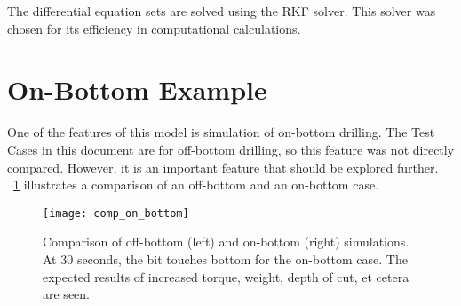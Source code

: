 \begin{mathwhere}[1.0in]
\end{mathwhere}
The differential equation sets are solved using the RKF solver. This solver was chosen for its efficiency in computational calculations.


\section{On-Bottom Example}
One of the features of this model is simulation of on-bottom drilling.  The Test Cases in this document are for off-bottom drilling, so this feature was not directly compared.  However, it is an important feature that should be explored further. \figurename~\ref{findings} illustrates a comparison of an off-bottom and an on-bottom case.
\begin{figure}
  \centering
  \texttt{[image: comp\_on\_bottom]}
  \caption[Comparison of off-bottom and on-bottom simulations]{Comparison of off-bottom (left) and on-bottom (right) simulations.  At 30 seconds, the bit touches bottom for the on-bottom case.  The expected results of increased torque, weight, depth of cut, et cetera are seen.}\label{findings}
\end{figure} 